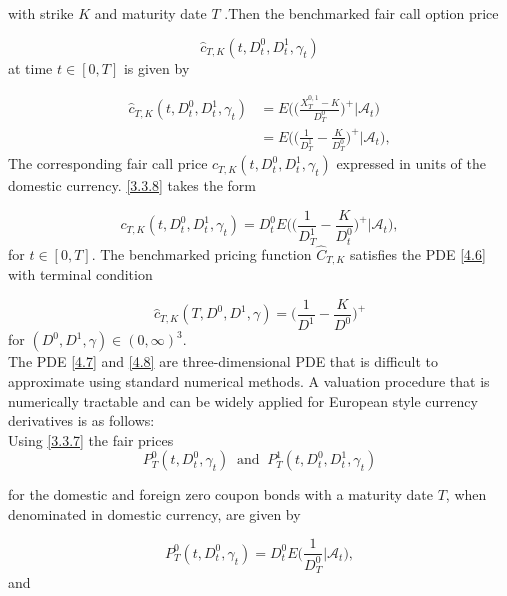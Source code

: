 \documentclass[a4 paper, 12pt]{report}
\theoremstyle{plain}
\begin{document}
with strike $K$ and maturity date $T$ .Then the benchmarked fair call option price

$$
\hat{c}_{T,K}(t,D_t^0,D_t^1,\gamma_t)
$$
at time $t\in[0,T]$ is given by

\begin{equation}\label{4.2.1}
\begin{split}
\hat{c}_{T,K}(t,D_t^0,D_t^1,\gamma_t)& = E\bigg(\bigg(\frac{X_T^{0,1} - K}{D_T^0}\bigg)^+\bigg|\mathcal{A}_t\bigg)\\
& = E\bigg(\bigg(\frac{1}{D_T^1} - \frac{K}{D_T^0}\bigg)^+\bigg|\mathcal{A}_t\bigg),
\end{split}
\end{equation}
The corresponding fair call price ${c}_{T,K}(t,D_t^0,D_t^1,\gamma_t)$ expressed in units of the domestic currency. \eqref{3.3.8} takes the form


\begin{equation}\label{4.2.2}
{c}_{T,K}(t,D_t^0,D_t^1,\gamma_t) = D_t^0E\bigg(\bigg(\frac{1}{D_T^1} - \frac{K}{D_t^0}\bigg)^+\bigg|\mathcal{A}_t\bigg),
\end{equation}
for $t\in [0,T]$. The benchmarked pricing function $\hat{C}_{T,K}$ satisfies the PDE \eqref{4.6} with terminal condition

\begin{equation}\label{4.2.3}
\hat{c}_{T,K}(T,D^0,D^1,\gamma) = \bigg(\frac{1}{D^1}-\frac{K}{D^0}\bigg)^+
\end{equation}
for $(D^0,D^1,\gamma)\in(0,\infty)^3$.\\

The PDE \eqref{4.7} and \eqref{4.8} are three-dimensional PDE that is difficult to
approximate using standard numerical methods. A valuation procedure that is
numerically tractable and can be widely applied for European style currency
derivatives is as follows:\\
Using \eqref{3.3.7} the fair prices
\begin{equation}\label{6.3}
P_T^0(t,D_t^0,\gamma_t)~\mbox{  and  }~ P_T^1(t,D_t^0,D_t^1,\gamma_t)
\end{equation}

for the domestic and foreign zero coupon bonds with a maturity date $T$, when denominated in domestic currency, are given by



\begin{equation}\label{6.4}
P_T^0(t,D_t^0,\gamma_t) = D_t^0E\bigg(\frac{1}{D_T^0}\bigg|\mathcal{A}_t\bigg),
\end{equation}
and
\end{document}
